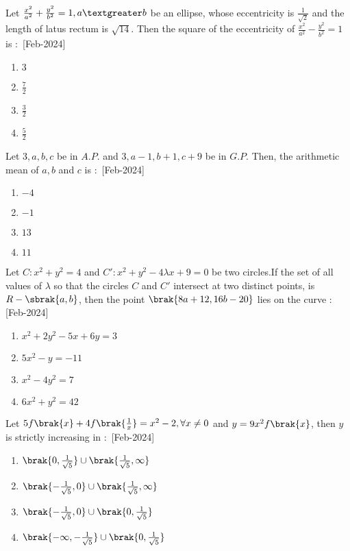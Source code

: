 \iffalse
\title{2024}
\author{EE24BTECH11021}
\section{mcq-single}
\fi
    \item Let $\frac{x^2}{a^2}+\frac{y^2}{b^2}=1,a\textgreater b$ be an ellipse, whose eccentricity is $\frac{1}{\sqrt{2}}$ and the length of latus rectum is $\sqrt{14}$. Then the square of the eccentricity of $\frac{x^2}{a^2}-\frac{y^2}{b^2}=1$ is $\colon$
    \hfill{[Feb-2024]}
        \begin{enumerate}
            \item $3$
            \item $\frac{7}{2}$
            \item $\frac{3}{2}$
            \item $\frac{5}{2}$
        \end{enumerate}
    \item Let $3,a,b,c$ be in $A.P.$ and $3,a-1,b+1,c+9$ be in $G.P.$ Then, the arithmetic mean of $a,b$ and $c$ is $\colon$
    \hfill{[Feb-2024]}
        \begin{enumerate}
            \item $-4$
            \item $-1$
            \item $13$
            \item $11$
        \end{enumerate}
    \item Let $C\colon x^2+y^2=4$ and $C\prime\colon x^2+y^2-4\lambda x+9=0$ be two circles.If the set of all values of $\lambda$ so that the circles $C$ and $C\prime$ intersect at two distinct points, is $R-\sbrak{a,b}$, then the point $\brak{8a+12,16b-20}$ lies on the curve $\colon$
    \hfill{[Feb-2024]}
        \begin{enumerate}
            \item $x^2+2y^2-5x+6y=3$
            \item $5x^2-y=-11$
            \item $x^2-4y^2=7$
            \item $6x^2+y^2=42$
        \end{enumerate}
    \item Let $5f\brak{x}+4f\brak{\frac{1}{x}}=x^2-2,\forall x\neq 0$ and $y=9x^2f\brak{x}$, then $y$ is strictly increasing in $\colon$
    \hfill{[Feb-2024]}
        \begin{enumerate}
            \item $\brak{0,\frac{1}{\sqrt{5}}}\cup \brak{\frac{1}{\sqrt{5}},\infty}$
            \item $\brak{-\frac{1}{\sqrt{5}},0}\cup \brak{\frac{1}{\sqrt{5}},\infty}$
            \item $\brak{-\frac{1}{\sqrt{5}},0}\cup \brak{0,\frac{1}{\sqrt{5}}}$
            \item $\brak{-\infty,-\frac{1}{\sqrt{5}}}\cup \brak{0,\frac{1}{\sqrt{5}}}$
        \end{enumerate}
